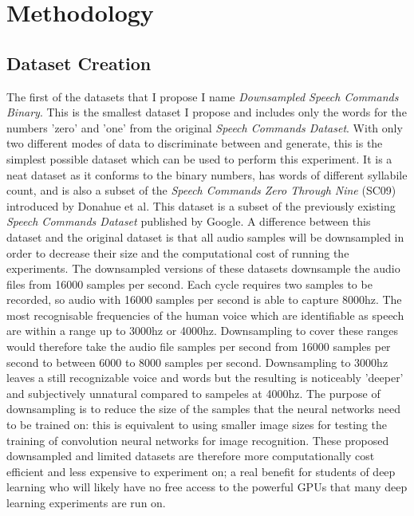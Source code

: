 \documentclass[a4paper, titlepage]{article}
\begin{document}
\section{Methodology}

\subsection{Dataset Creation}

The first of the datasets that I propose I name \textit{Downsampled Speech Commands Binary}.
This is the smallest dataset I propose and includes only the words for the numbers 'zero' and 'one' from the original \textit{Speech Commands Dataset}.
With only two different modes of data to discriminate between and generate, this is the simplest possible dataset which can be used to perform this experiment.
It is a neat dataset as it conforms to the binary numbers, has words of different syllabile count, and is also a subset of the \textit{Speech Commands Zero Through Nine} (SC09) introduced by Donahue et al.
\newline
\newline
This dataset is a subset of the previously existing \textit{Speech Commands Dataset} \cite{speechcommands} published by Google.
A difference between this dataset and the original dataset is that all audio samples will be downsampled in order to decrease their size and the computational cost of running the experiments.
\newline
\newline
The downsampled versions of these datasets downsample the audio files from 16000 samples per second.
Each cycle requires two samples to be recorded, so audio with 16000 samples per second is able to capture 8000hz.
The most recognisable frequencies of the human voice which are identifiable as speech are within a range up to 3000hz or 4000hz.
Downsampling to cover these ranges would therefore take the audio file samples per second from 16000 samples per second to between 6000 to 8000 samples per second.
Downsampling to 3000hz leaves a still recognizable voice and words but the resulting is noticeably 'deeper' and subjectively unnatural compared to sampeles at 4000hz.
\newline
\newline
The purpose of downsampling is to reduce the size of the samples that the neural networks need to be trained on: this is equivalent to using smaller image sizes for testing the training of convolution neural networks for image recognition.
These proposed downsampled and limited datasets are therefore more computationally cost efficient and less expensive to experiment on; a real benefit for students of deep learning who will likely have no free access to the powerful GPUs that many deep learning experiments are run on.
\end{document}
